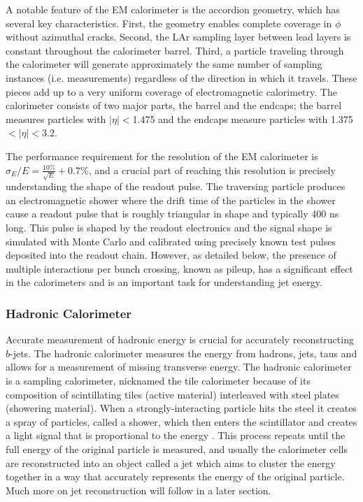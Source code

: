 A notable feature of the EM calorimeter is the accordion geometry, which has several key characteristics.  First, the geometry enables complete coverage in $\phi$ without azimuthal cracks.  Second, the LAr sampling layer between lead layers is constant throughout the calorimeter barrel.  Third, a particle traveling through the calorimeter will generate approximately the same number of sampling instances (i.e. measurements) regardless of the direction in which it travels.  These pieces add up to a very uniform coverage of electromagnetic calorimetry.  The calorimeter consists of two major parts, the barrel and the endcaps; the barrel measures particles with $|\eta|<$1.475 and the endcaps measure particles with 1.375$<|\eta|<$3.2.  

The performance requirement for the resolution of the EM calorimeter is $\sigma_E/E=\frac{10\%}{\sqrt{E}}+$0.7\%, and a crucial part of reaching this resolution is precisely understanding the shape of the readout pulse.  The traversing particle produces an electromagnetic shower where the drift time of the particles in the shower cause a readout pulse that is roughly triangular in shape and typically 400 ns long.  This pulse is shaped by the readout electronics and the signal shape is simulated with Monte Carlo and calibrated using precisely known test pulses deposited into the readout chain.  However, as detailed below, the presence of multiple interactions per bunch crossing, known as pileup, has a significant effect in the calorimeters and is an important task for understanding jet energy.

\subsubsection{Hadronic Calorimeter} 
\label{sec:h_cal}
Accurate measurement of hadronic energy is crucial for accurately reconstructing $b$-jets.  The hadronic calorimeter measures the energy from hadrons, jets, taus and allows for a measurement of missing transverse energy.  The hadronic calorimeter is a sampling calorimeter, nicknamed the tile calorimeter because of its composition of scintillating tiles (active material) interleaved with steel plates (showering material).  When a strongly-interacting particle hits the steel it creates a spray of particles, called a shower, which then enters the scintillator and creates a light signal that is proportional to the energy .  This process repeats until the full energy of the original particle is measured, and usually the calorimeter cells are reconstructed into an object called a jet which aims to cluster the energy together in a way that accurately represents the energy of the original particle.  Much more on jet reconstruction will follow in a later section.

